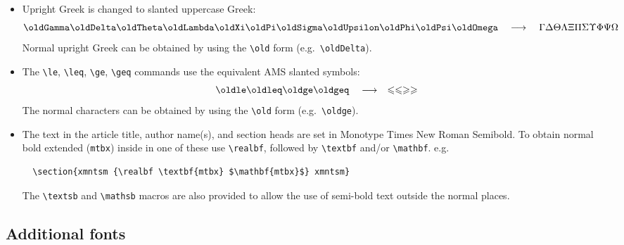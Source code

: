 \documentclass{jfm}
\newcommand\lra{\ensuremath{\quad\longrightarrow\quad}}
\let\le=\leqslant  \let\leq=\leqslant
\let\ge=\geqslant  \let\geq=\geqslant
\newcommand\eg{e.g.\ }
\begin{document}
\begin{itemize}\itemsep=6pt
\item Upright Greek is changed to slanted uppercase Greek:
\[
   \oldGamma \oldDelta \oldTheta \oldLambda \oldXi \oldPi \oldSigma
   \oldUpsilon \oldPhi \oldPsi \oldOmega
 \lra
\Gamma \Delta \Theta \Lambda \Xi \Pi \Sigma \Upsilon \Phi \Psi \Omega
\]
Normal upright Greek can be obtained by using the \verb|\old|
form (\eg \verb|\oldDelta|).

\item The \verb|\le|, \verb|\leq|, \verb|\ge|, \verb|\geq| commands
use the equivalent AMS slanted symbols:
\[
\oldle \oldleq \oldge \oldgeq
 \lra
\le \leq \ge \geq
\]
The normal characters can be obtained by using the \verb|\old| form
(\eg \verb|\oldge|).

\item The text in the article title, author name(s), and section heads
are set in Monotype Times New Roman Semibold. To obtain normal bold
extended (\verb|mtbx|) inside in one of these use \verb|\realbf|, followed
by \verb"\textbf" and/or \verb"\mathbf". \eg
\begin{verbatim}
  \section{xmntsm {\realbf \textbf{mtbx} $\mathbf{mtbx}$} xmntsm}
\end{verbatim}
The \verb"\textsb" and \verb"\mathsb" macros are also provided
to allow the use of semi-bold text outside the normal places.
\end{itemize}

\subsection{Additional fonts}
\end{document}
